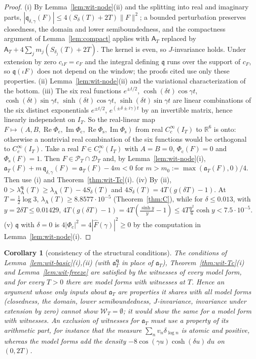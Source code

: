 \documentclass[11pt]{amsart}
\newtheorem{corollary}[theorem]{Corollary}
\theoremstyle{definition}
\theoremstyle{remark}
\newcommand{\R}{\mathbb R}
\newcommand{\Rel}{\operatorname{Re}}
\newcommand{\Iml}{\operatorname{Im}}
\newcommand{\PT}{\mathcal P_T}
\newcommand{\IT}{I_T}
\newcommand{\lamA}{\lambda_{\mathrm A}(T)}
\newcommand{\Fh}{\widehat F}
\newcommand{\cF}{c_F}
\newcommand{\Aconst}{\mathsf A_T}
\begin{document}
\begin{proof}
(i) By Lemma~\ref{lem:wit-node}(ii) and the splitting into real and imaginary parts, $|\mathfrak q_{\delta,\gamma}(F)|\le
4(S_\delta(T)+2T)\|F\|^2$; a bounded perturbation preserves closedness, the domain and lower semiboundedness, and the
compactness argument of Lemma~\ref{lem:compact} applies with $\Aconst$ replaced by $\Aconst+4\sum_jm_j(S_{\delta_j}(T)+2T)$.
The kernel is even, so $J$-invariance holds. Under extension by zero $c_{\iota F}=\cF$ and the integral defining
$\mathfrak q$ runs over the support of $\cF$, so $\mathfrak q(\iota F)$ does not depend on the window; the proofs cited use
only these properties. (ii) Lemma~\ref{lem:wit-node}(ii) and the variational characterization of the bottom.
(iii) The six real functions $e^{\pm t/2}$, $\cosh(\delta t)\cos\gamma t$, $\cosh(\delta t)\sin\gamma t$, $\sinh(\delta t)\cos\gamma t$,
$\sinh(\delta t)\sin\gamma t$ are linear combinations of the six distinct exponentials $e^{\pm t/2}$, $e^{(\pm\delta\pm i\gamma)t}$ by an
invertible matrix, hence linearly independent on $\IT$. So the real-linear map
$F\mapsto(A,B,\Rel\Phi_{\mathrm c},\Iml\Phi_{\mathrm c},\Rel\Phi_{\mathrm s},\Iml\Phi_{\mathrm s})$ from real $C_c^\infty(\IT)$ to $\R^6$ is onto:
otherwise a nontrivial real combination of the six functions would be orthogonal to $C_c^\infty(\IT)$. Take a real
$F\in C_c^\infty(\IT)$ with $A=B=0$, $\Phi_{\mathrm c}(F)=0$ and $\Phi_{\mathrm s}(F)=1$. Then $F\in\PT\cap\mathcal D_T$ and, by
Lemma~\ref{lem:wit-node}(i), $\mathfrak a_T(F)+m\,\mathfrak q_{\delta,\gamma}(F)=\mathfrak a_T(F)-4m<0$ for $m>m_0:=\max(\mathfrak a_T(F),0)/4$.
Then use (i) and Theorem~\ref{thm:wit-Tc}(i). (iv) By (ii), $0>\lambda^{\mathbf q}_{\mathrm A}(T)\ge\lamA-4S_\delta(T)$ and
$4S_\delta(T)=4T(g(\delta T)-1)$. At $T=\frac12\log3$, $\lamA\ge8.8577\cdot10^{-5}$ (Theorem~\ref{thm:C}), while for
$\delta\le0.013$, with $y=2\delta T\le0.01429$, $4T(g(\delta T)-1)=4T(\frac{\sinh y}y-1)\le4T\frac{y^2}6\cosh y<7.5\cdot10^{-5}$.
(v) $\mathfrak q$ with $\delta=0$ is $4|\Phi_{\mathrm c}|^2=4|\Fh(\gamma)|^2\ge0$ by the computation in Lemma~\ref{lem:wit-node}(i).
\end{proof}

\begin{corollary}[consistency of the structural conditions]\label{cor:wit-consistent}
The conditions of Lemma~\ref{lem:wit-basic}(i),(ii) (with $\mathfrak a^{\mathbf q}_T$ in place of $\mathfrak a_T$),
Theorem~\ref{thm:wit-Tc}(i) and Lemma~\ref{lem:wit-freeze} are satisfied by the witnesses of every model form, and for
every $T>0$ there are model forms with witnesses at $T$. Hence an argument whose only inputs about $\mathfrak a_T$ are
properties it shares with all model forms (closedness, the domain, lower semiboundedness, $J$-invariance, invariance
under extension by zero) cannot show $\mathscr W_T=\emptyset$; it would show
the same for a model form with witnesses. An exclusion of witnesses for $\mathfrak a_T$ must use a property of its
arithmetic part, for instance that the measure $\sum_nv_n\delta_{\log n}$ is atomic and positive, whereas the model forms
add the density $-8\cos(\gamma u)\cosh(\delta u)\,du$ on $(0,2T)$.
\end{corollary}
\end{document}
